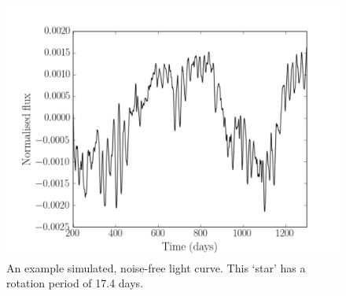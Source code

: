 


\begin{figure}
\begin{center}
\includegraphics[width=6in, clip=true]{figures/thesis_plot.pdf}
\caption[A simulated light curve.]
{An example simulated, noise-free light curve. This `star' has a
rotation period of 17.4 days.}
\label{fig:noise-free_lc}
\end{center}
\end{figure}


